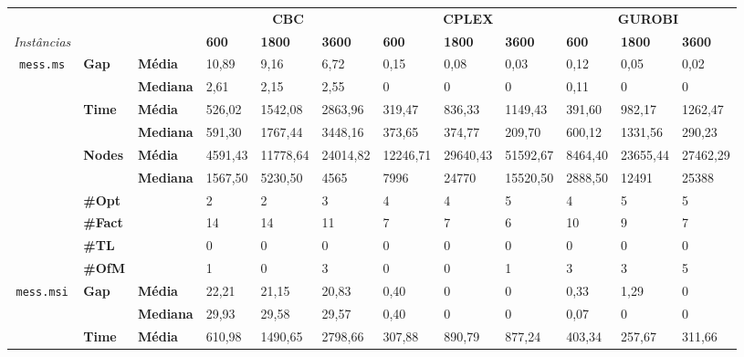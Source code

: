 
	\begin{footnotesize}	
	\caption{}
	\label{cflp:tab:9}
	\begin{tabular}{c@{\hskip 0.2cm}l@{\hskip 0.1cm}l|lll|lll|lll}
	& & & \multicolumn{3}{c}{\textbf{CBC}} & \multicolumn{3}{c}{\textbf{CPLEX}} & \multicolumn{3}{c}{\textbf{GUROBI}} 	\\\textit{Instâncias} & & & \textbf{600} & \textbf{1800} & \textbf{3600} & \textbf{600} & \textbf{1800} & \textbf{3600} & \textbf{600} & \textbf{1800} & \textbf{3600} \\
\hline
\multirow{7}{*}{\texttt{mess.ms}} & \multirow{2}{*}{\textbf{Gap}} & \textbf{Média} & 10,89 & 9,16 & 6,72 & 0,15 & 0,08 & 0,03 & 0,12 & 0,05 & 0,02 \\
 & & \textbf{Mediana} & 2,61 & 2,15 & 2,55 & 0 & 0 & 0 & 0,11 & 0 & 0 \\
\cline{2-12}
 & \multirow{2}{*}{\textbf{Time}} & \textbf{Média} & 526,02 & 1542,08 & 2863,96 & 319,47 & 836,33 & 1149,43 & 391,60 & 982,17 & 1262,47 \\
 & & \textbf{Mediana} & 591,30 & 1767,44 & 3448,16 & 373,65 & 374,77 & 209,70 & 600,12 & 1331,56 & 290,23 \\
\cline{2-12}
 & \multirow{2}{*}{\textbf{Nodes}} & \textbf{Média} & 4591,43 & 11778,64 & 24014,82 & 12246,71 & 29640,43 & 51592,67 & 8464,40 & 23655,44 & 27462,29 \\
 & & \textbf{Mediana} & 1567,50 & 5230,50 & 4565 & 7996 & 24770 & 15520,50 & 2888,50 & 12491 & 25388 \\
\cline{2-12}
 & \textbf{\#Opt} & & 2 & 2 & 3 & 4 & 4 & 5 & 4 & 5 & 5 \\
 & \textbf{\#Fact} & & 14 & 14 & 11 & 7 & 7 & 6 & 10 & 9 & 7 \\
 & \textbf{\#TL} & & 0 & 0 & 0 & 0 & 0 & 0 & 0 & 0 & 0 \\
 & \textbf{\#OfM} & & 1 & 0 & 3 & 0 & 0 & 1 & 3 & 3 & 5 \\
\hline
\multirow{7}{*}{\texttt{mess.msi}} & \multirow{2}{*}{\textbf{Gap}} & \textbf{Média} & 22,21 & 21,15 & 20,83 & 0,40 & 0 & 0 & 0,33 & 1,29 & 0 \\
 & & \textbf{Mediana} & 29,93 & 29,58 & 29,57 & 0,40 & 0 & 0 & 0,07 & 0 & 0 \\
\cline{2-12}
 & \multirow{2}{*}{\textbf{Time}} & \textbf{Média} & 610,98 & 1490,65 & 2798,66 & 307,88 & 890,79 & 877,24 & 403,34 & 257,67 & 311,66 \\

\end{tabular}
\end{footnotesize}
